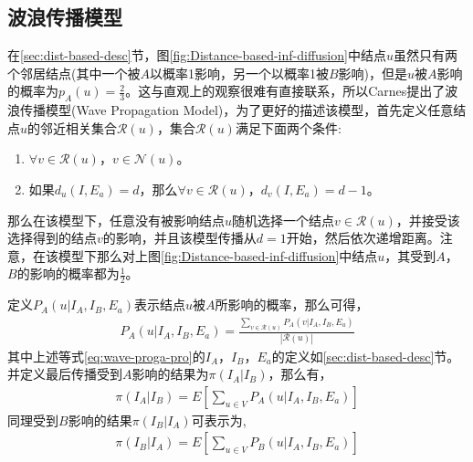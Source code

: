 \subsection{波浪传播模型}
\label{sec:wave-prop-desc}
在\ref{sec:dist-based-desc}节，图\ref{fig:Distance-based-inf-diffusion}中结点$u$虽然只有两个邻居结点(其中一个被$A$以概率1影响，另一个以概率1被$B$影响)，但是$u$被$A$影响的概率为$p_{A}(u)=\frac{2}{3}$。这与直观上的观察很难有直接联系，所以Carnes\cite{carnes2007maximizing}提出了波浪传播模型(Wave Propagation Model)，为了更好的描述该模型，首先定义任意结点$u$的邻近相关集合$\mathcal{R}(u)$，集合$\mathcal{R}(u)$满足下面两个条件:
\begin{enumerate}
\item $\forall v \in \mathcal{R}(u)$，$v \in \mathcal{N}(u)$。
\item 如果$d_{u}(I, E_{a})=d$，那么$\forall v \in \mathcal{R}(u)$，$d_{v}(I, E_{a})=d-1$。
\end{enumerate}
那么在该模型下，任意没有被影响结点$u$随机选择一个结点$v \in \mathcal{R}(u)$，并接受该选择得到的结点$v$的影响，并且该模型传播从$d=1$开始，然后依次递增距离。注意，在该模型下那么对上图\ref{fig:Distance-based-inf-diffusion}中结点$u$，其受到$A$，$B$的影响的概率都为$\frac{1}{2}$。


定义$P_{A}(u|I_{A}, I_{B}, E_{a})$表示结点$u$被$A$所影响的概率，那么可得，
\begin{equation}
\label{eq:wave-proga-pro}
\begin{aligned}
P_{A}(u|I_{A}, I_{B}, E_{a}) = \frac{\sum_{v \in \mathcal{R}(u)}P_{A}(v|I_{A}, I_{B}, E_{a})}{|\mathcal{R}(u)|}
\end{aligned}
\end{equation}
其中上述等式\ref{eq:wave-proga-pro}的$I_{A}$，$I_{B}$，$E_{a}$的定义如\ref{sec:dist-based-desc}节。并定义最后传播受到$A$影响的结果为$\pi(I_{A}|I_{B})$，那么有，
\begin{equation}
\label{eq:wave-proga-resultA}
\begin{aligned}
\pi(I_{A}|I_{B}) = E \left[ \sum_{u \in V} P_{A}(u|I_{A}, I_{B}, E_{a}) \right]
\end{aligned}
\end{equation}
同理受到$B$影响的结果$\pi(I_{B}|I_{A})$可表示为,
\begin{equation}
\label{eq:wave-proga-resultB}
\begin{aligned}
\pi(I_{B}|I_{A}) = E \left[ \sum_{u \in V} P_{B}(u|I_{A}, I_{B}, E_{a}) \right]
\end{aligned}
\end{equation}


